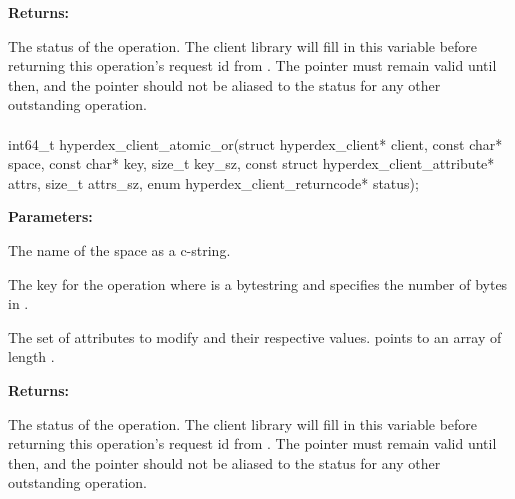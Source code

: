 \noindent\textbf{Returns:}
\begin{description}[labelindent=\widthof{{\code{status}}},leftmargin=*,noitemsep,nolistsep,align=right]
\item[\code{status}] The status of the operation.  The client library will fill in this variable before returning this operation's request id from .  The pointer must remain valid until then, and the pointer should not be aliased to the status for any other outstanding operation.
\end{description}

\paragraph{}
\label{api:c:atomic_or}
\begin{ccode}
int64_t hyperdex_client_atomic_or(struct hyperdex_client* client,
                const char* space,
                const char* key, size_t key_sz,
                const struct hyperdex_client_attribute* attrs, size_t attrs_sz,
                enum hyperdex_client_returncode* status);
\end{ccode}
\funcdesc 

\noindent\textbf{Parameters:}
\begin{description}[labelindent=\widthof{{\code{attrs}, \code{attrs\_sz}}},leftmargin=*,noitemsep,nolistsep,align=right]
\item[\code{space}] The name of the space as a c-string.
\item[\code{key}, \code{key\_sz}] The key for the operation where  is a bytestring and  specifies the number of bytes in .
\item[\code{attrs}, \code{attrs\_sz}] The set of attributes to modify and their respective values.   points to an array of length .
\end{description}

\noindent\textbf{Returns:}
\begin{description}[labelindent=\widthof{{\code{status}}},leftmargin=*,noitemsep,nolistsep,align=right]
\item[\code{status}] The status of the operation.  The client library will fill in this variable before returning this operation's request id from .  The pointer must remain valid until then, and the pointer should not be aliased to the status for any other outstanding operation.
\end{description}

